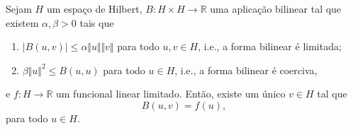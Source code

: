 \documentclass[a4paper, 11pt]{book}
\theoremstyle{definition}
\newcommand{\bR}{\mathbb{R}}
\begin{document}
\begin{tbox} \label{thm:lax-milgram}
    Sejam $H$ um espaço de Hilbert, $B : H \times H \to \bR$ uma aplicação bilinear tal que existem $\alpha, \beta > 0$ tais que
    \begin{enumerate}
        \item $| B(u,v)| \leqslant \alpha \Vert u \Vert \Vert v \Vert$ para todo $u,v \in H$, i.e., a forma bilinear é limitada;
        \item $\beta \Vert u \Vert^2 \leqslant B(u,u)$ para todo $u \in H$, i.e., a forma bilinear é coerciva,
    \end{enumerate}
    e $f : H \to \bR$ um funcional linear limitado. Então, existe um único $v \in H$ tal que
    \[
        B(u,v) = f(u),
    \]
    para todo $u \in H$.
\end{tbox}
\end{document}
